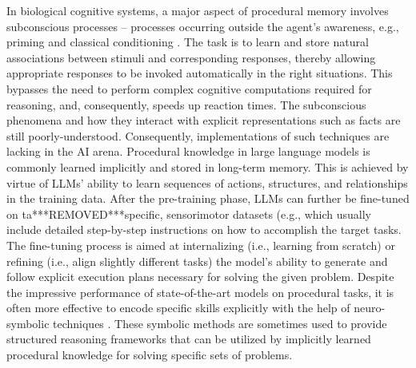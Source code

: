 \documentclass[10pt,journal,compsoc]{IEEEtran}
\begin{document}
	
	In biological cognitive systems, a major aspect of procedural memory involves subconscious processes \cite{schacter1987implicit} – processes occurring outside the agent’s awareness, e.g., priming \cite{schacter1992priming} and classical conditioning \cite{hopkins2015eye,spataro2017implicit}. The task is to learn and store natural associations between stimuli and corresponding responses, thereby allowing appropriate responses to be invoked automatically in the right situations. This bypasses the need to perform complex cognitive computations required for reasoning, and, consequently, speeds up reaction times. The subconscious phenomena and how they interact with explicit representations such as facts are still poorly-understood.  Consequently, implementations of such techniques are lacking in the AI arena. 
	Procedural knowledge in large language models is commonly learned implicitly and stored in long-term memory. This is achieved by virtue of LLMs’ ability to learn sequences of actions, structures, and relationships in the training data. After the pre-training phase, LLMs can further be fine-tuned on ta***REMOVED***specific, sensorimotor datasets (e.g., \cite{mon2024robotic} which usually include detailed step-by-step instructions on how to accomplish the target tasks. The fine-tuning process is aimed at internalizing (i.e., learning from scratch) or refining (i.e., align slightly different tasks) the model’s ability to generate and follow explicit execution plans necessary for solving the given problem. Despite the impressive performance of state-of-the-art models on procedural tasks, it is often more effective to encode specific skills explicitly with the help of neuro-symbolic techniques \cite{kwon2024fast,aktas2024vq,silver2024generalized}. These symbolic methods are sometimes used to provide structured reasoning frameworks that can be utilized by implicitly learned procedural knowledge for solving specific sets of problems. 
	
	
	
	
	
\end{document}

